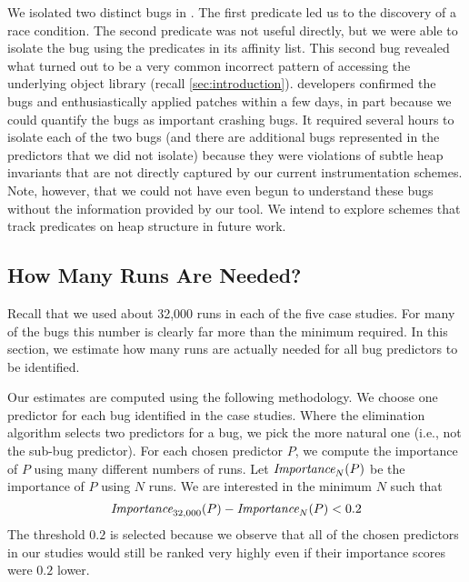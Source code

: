 We isolated two distinct bugs in \rhythmbox.  The first predicate led
us to the discovery of a race condition.  The second predicate was not
useful directly, but we were able to isolate the bug using the
predicates in its affinity list.  This second bug revealed what turned
out to be a very common incorrect pattern of accessing the underlying
object library (recall \autoref{sec:introduction}).  \rhythmbox
developers confirmed the bugs and enthusiastically applied patches
within a few days, in part because we could quantify the bugs as
important crashing bugs.  It required several hours to isolate each of
the two bugs (and there are additional bugs represented in the
predictors that we did not isolate) because they were violations of subtle heap
invariants that are not directly captured by our current
instrumentation schemes.  Note, however, that we could not have even
begun to understand these bugs without the information provided by our
tool.  We intend to explore schemes that track predicates on heap
structure in future work.

\subsection{How Many Runs Are Needed?}
\label{sec:numruns}



Recall that we used about 32,000 runs in each of the five case
studies.  For many of the bugs this number is clearly far more than
the minimum required.  In this section, we estimate how many runs are
actually needed for all bug predictors to be identified.

Our estimates are computed using the following methodology.
We choose one predictor for each bug identified
in the case studies.  Where the elimination algorithm selects two
predictors for a bug, we pick the more natural one (i.e., not the
sub-bug predictor).  For each chosen predictor $P$, we compute
the importance of $P$ using many different numbers of runs.
Let $\textit{Importance}_N(P)$ be the importance of $P$ using $N$ runs.
We are interested in the minimum $N$ such that
\[ \textit{Importance}_{32,000}(P) - \textit{Importance}_N(P) < 0.2 \]
The threshold $0.2$ is selected because we observe that 
all of the chosen predictors in our studies would still
be ranked very highly even if their importance scores were $0.2$ lower.

